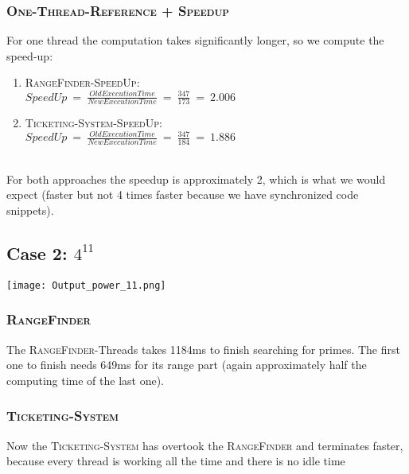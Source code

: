 \documentclass{article}
\begin{document}
\begin{adjustwidth}{2em}{2em}
\begin{adjustwidth}{2em}{2em}
			\subsubsection*{\textsc{One-Thread-Reference + Speedup}}
			\begin{adjustwidth}{1em}{}
				For one thread the computation takes significantly longer, so we compute the speed-up: \\
				\begin{enumerate}[]
					\item \textsc{RangeFinder-SpeedUp}: \\
					$\textit{SpeedUp} \ = \ \frac{\textit{OldExecutionTime}}{\textit{NewExecutionTime}} \ = \ \frac{347}{173} \ = \ 2.006$
					\item \textsc{Ticketing-System-SpeedUp}: \\
					$\textit{SpeedUp} \ = \ \frac{\textit{OldExecutionTime}}{\textit{NewExecutionTime}} \ = \ \frac{347}{184} \ = \ 1.886$
				\end{enumerate}
				\hfill \\
				For both approaches the speedup is approximately 2, which is what we would expect (faster but not 4 times faster because we have synchronized code snippets).
			\end{adjustwidth}
		\end{adjustwidth}
		
		\subsection*{Case 2: $4^{11}$}
		\begin{adjustwidth}{2em}{2em}
			\texttt{[image: Output\_power\_11.png]}
			\subsubsection*{\textsc{RangeFinder}}
			\begin{adjustwidth}{1em}{}
				The \textsc{RangeFinder}-Threads takes 1184ms to finish searching for primes. The first one to finish needs 649ms for its range part (again approximately half the computing time of the last one).
			\end{adjustwidth}
			\subsubsection*{\textsc{Ticketing-System}}
			\begin{adjustwidth}{1em}{}
				Now the \textsc{Ticketing-System} has overtook the \textsc{RangeFinder} and terminates faster, because every thread is working all the time and there is no idle time
			\end{adjustwidth}

\end{adjustwidth}
\end{adjustwidth}
\end{document}
